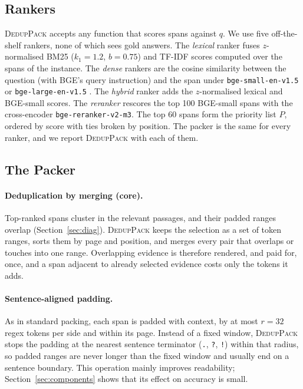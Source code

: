 \documentclass[11pt]{article}
\newcommand{\spk}{\textsc{DedupPack}}
\begin{document}
\subsection{Rankers}
\spk{} accepts any function that scores spans against $q$. We use five off-the-shelf rankers, none of which sees gold answers. The \emph{lexical} ranker fuses $z$-normalised BM25 ($k_1{=}1.2$, $b{=}0.75$) and TF-IDF scores computed over the spans of the instance. The \emph{dense} rankers are the cosine similarity between the question (with BGE's query instruction) and the span under \texttt{bge-small-en-v1.5} or \texttt{bge-large-en-v1.5} \citep{xiao2023cpack}. The \emph{hybrid} ranker adds the $z$-normalised lexical and BGE-small scores. The \emph{reranker} rescores the top 100 BGE-small spans with the cross-encoder \texttt{bge-reranker-v2-m3}. The top 60 spans form the priority list $P$, ordered by score with ties broken by position. The packer is the same for every ranker, and we report \spk{} with each of them.

\subsection{The Packer}
\paragraph{Deduplication by merging (core).} Top-ranked spans cluster in the relevant passages, and their padded ranges overlap (Section~\ref{sec:diag}). \spk{} keeps the selection as a set of token ranges, sorts them by page and position, and merges every pair that overlaps or touches into one range. Overlapping evidence is therefore rendered, and paid for, once, and a span adjacent to already selected evidence costs only the tokens it adds.

\paragraph{Sentence-aligned padding.} As in standard packing, each span is padded with context, by at most $r=32$ regex tokens per side and within its page. Instead of a fixed window, \spk{} stops the padding at the nearest sentence terminator (\texttt{.}, \texttt{?}, \texttt{!}) within that radius, so padded ranges are never longer than the fixed window and usually end on a sentence boundary. This operation mainly improves readability; Section~\ref{sec:components} shows that its effect on accuracy is small.
\end{document}
